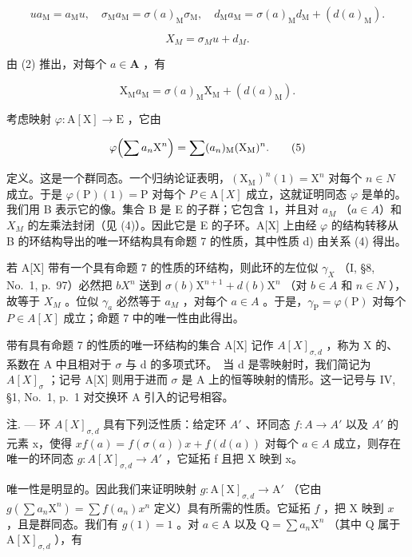 \[
u a _ {\mathrm{M}} = a _ {\mathrm{M}} u, \quad \sigma_ {\mathrm{M}} a _ {\mathrm{M}} = \sigma (a) _ {\mathrm{M}} \sigma_ {\mathrm{M}}, \quad d _ {\mathrm{M}} a _ {\mathrm{M}} = \sigma (a) _ {\mathrm{M}} d _ {\mathrm{M}} + (d (a) _ {\mathrm{M}}).\tag{2}
\]

\[
X_ {M} = \sigma_ {M} u+ d_ {M} .\tag{3}
\]

由 (2) 推出，对每个 \(a \in \mathbf{A}\) ，有

\[
\mathrm{X} _ {\mathrm{M}} a _ {\mathrm{M}} = \sigma (a) _ {\mathrm{M}} \mathrm{X} _ {\mathrm{M}} + (d (a) _ {\mathrm{M}}).\tag{4}
\]

考虑映射 \(\varphi : \mathrm{A}[\mathrm{X}] \to \mathrm{E}\) ，它由

\[
\varphi \Bigl (\sum a _ {n} \mathrm{X} ^ {n} \Bigr) = \sum (a _ {n}) _ {\mathrm{M}} (\mathrm{X} _ {\mathrm{M}}) ^ {n}.\tag{5}
\]

定义。这是一个群同态。一个归纳论证表明，\((\mathrm{X}_{\mathrm{M}})^{n}(1)=\mathrm{X}^{n}\) 对每个 \(n\in N\) 成立。于是 \(\varphi(\mathrm{P})(1)=\mathrm{P}\) 对每个 \(P\in\mathrm{A}[X]\) 成立，这就证明同态 \(\varphi\) 是单的。我们用 B 表示它的像。集合 B 是 E 的子群；它包含 1，并且对 \(a_{M}\) （\(a\in A\)）和 \(X_{M}\) 的左乘法封闭（见 (4)）。因此它是 E 的子环。A{[}X{]} 上由经 \(\varphi\) 的结构转移从 B 的环结构导出的唯一环结构具有命题 7 的性质，其中性质 d) 由关系 (4) 得出。

若 A{[}X{]} 带有一个具有命题 7 的性质的环结构，则此环的左位似 \(\gamma_{X}\) （I, §8, No.~1, p.~97）必然把 \(bX^{n}\) 送到 \(\sigma(b)\mathrm{X}^{n+1} + d(b)\mathrm{X}^{n}\) （对 \(b \in A\) 和 \(n \in N\) ），故等于 \(X_{M}\) 。位似 \(\gamma_{a}\) 必然等于 \(a_{M}\) ，对每个 \(a \in A\) 。于是，\(\gamma_{\mathrm{P}} = \varphi(\mathrm{P})\) 对每个 \(P \in A[X]\) 成立；命题 7 中的唯一性由此得出。

带有具有命题 7 的性质的唯一环结构的集合 A{[}X{]} 记作 \(A[X]_{\sigma,d}\) ，称为 X 的、系数在 A 中且相对于 \(\sigma\) 与 d 的多项式环。~当 d 是零映射时，我们简记为 \(A[X]_{\sigma}\) ；记号 A{[}X{]} 则用于进而 \(\sigma\) 是 A 上的恒等映射的情形。这一记号与 IV, §1, No.~1, p.~1 对交换环 A 引入的记号相容。

注. --- 环 \(A[X]_{\sigma,d}\) 具有下列泛性质：给定环 \(A'\) 、环同态 \(f: A \to A'\) 以及 \(A'\) 的元素 x，使得 \(xf(a) = f(\sigma(a))x + f(d(a))\) 对每个 \(a \in A\) 成立，则存在唯一的环同态 \(g: A[X]_{\sigma,d} \to A'\) ，它延拓 f 且把 X 映到 x。

唯一性是明显的。因此我们来证明映射 \(g: \mathrm{A}[\mathrm{X}]_{\sigma,d} \to \mathrm{A}'\) （它由 \(g(\sum a_n\mathrm{X}^n) = \sum f(a_n)x^n\) 定义）具有所需的性质。它延拓 \(f\) ，把 \(\mathrm{X}\) 映到 \(x\) ，且是群同态。我们有 \(g(1) = 1\) 。对 \(a \in \mathrm{A}\) 以及 \(\mathrm{Q} = \sum a_n\mathrm{X}^n\) （其中 Q 属于 \(\mathrm{A}[\mathrm{X}]_{\sigma,d}\) ），有

